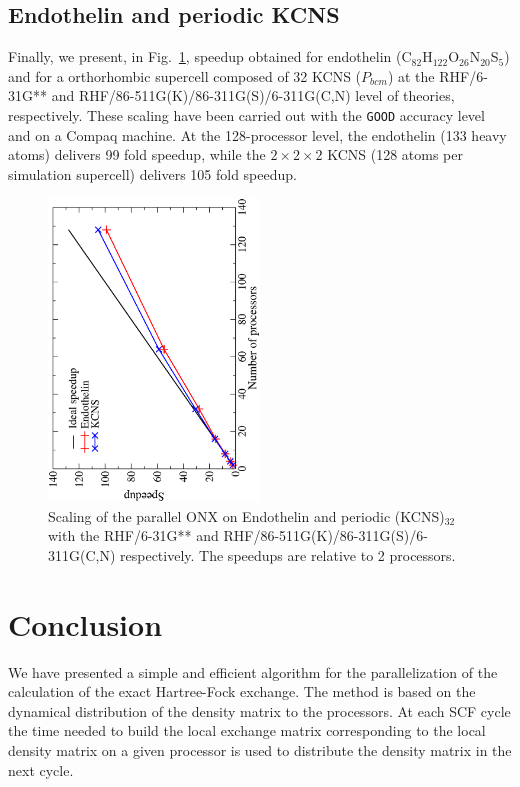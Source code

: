 \documentclass[prl,twocolumn,showpacs,twocolumngrid,superbib]{revtex4}
\begin{document}
\subsection{Endothelin and periodic KCNS}
Finally, we present, in Fig.~\ref{fig:Endothelin_KCNS}, speedup obtained for 
endothelin (C$_{82}$H$_{122}$O$_{26}$N$_{20}$S$_5$) and
for a orthorhombic supercell composed of 32 KCNS ($P_{bcm}$)
at the RHF/6-31G** and RHF/86-511G(K)/86-311G(S)/6-311G(C,N) 
level of theories, respectively.
These scaling have been carried out with the {\tt GOOD} accuracy level 
and on a Compaq machine.
At the 128-processor level, the endothelin (133 heavy atoms) delivers 99 fold
speedup, while the $2\times 2\times 2$ KCNS (128 atoms per simulation supercell)
delivers 105 fold speedup. 

\begin{figure}[p]
  \caption{\protect
    Scaling of the parallel ONX on Endothelin and periodic (KCNS)$_32$ with 
    the RHF/6-31G** and RHF/86-511G(K)/86-311G(S)/6-311G(C,N) respectively.
    The speedups are relative to 2 processors.
  }\label{fig:Endothelin_KCNS}
  \includegraphics[angle=-90,width=0.5\textwidth]{Endothelin_KCNS}
\end{figure}

\section{Conclusion}\label{Sec:Conc}

 We have presented a simple and efficient algorithm for 
 the parallelization of the calculation of the exact Hartree-Fock
 exchange. The method is based on the dynamical distribution 
 of the density matrix to the processors. At each SCF cycle the
 time needed to build the local exchange matrix corresponding
 to the local density matrix on a given processor is used to
 distribute the density matrix in the next cycle. 
\end{document}
